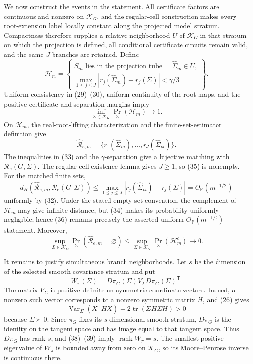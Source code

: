 We now construct the events in the statement.  All certificate factors are continuous and nonzero on \(\mathcal K_G\), and the regular-cell construction makes every root-extension label locally constant along the projected model stratum.  Compactness therefore supplies a relative neighborhood \(U\) of \(\mathcal K_G\) in that stratum on which the projection is defined, all conditional certificate circuits remain valid, and the same \(J\) branches are retained.  Define
\[
 \mathcal H_m
 =\left\{
 \begin{array}{l}
 S_m\text{ lies in the projection tube},\quad
 \widehat\Sigma_m\in U,\\[2pt]
 \displaystyle
 \max_{1\leq j\leq J}
 |r_j(\widehat\Sigma_m)-r_j(\Sigma)|<\gamma/3
 \end{array}
 \right\}.                                                      \tag{33}
\]
Uniform consistency in (29)--(30), uniform continuity of the root maps, and the positive certificate and separation margins imply
\[
 \inf_{\Sigma\in\mathcal K_G}
 \Pr_\Sigma(\mathcal H_m)\longrightarrow1.                     \tag{34}
\]
On \(\mathcal H_m\), the real-root-lifting characterization and the finite-set-estimator definition give
\[
 \widehat{\mathcal R}_{e,m}
 =\{r_1(\widehat\Sigma_m),\ldots,r_J(\widehat\Sigma_m)\}.      \tag{35}
\]
The inequalities in (33) and the \(\gamma\)-separation give a bijective matching with \(\mathcal R_e(G,\Sigma)\).  The regular-cell-existence lemma gives \(J\geq1\), so (35) is nonempty.  For the matched finite sets,
\[
 d_H\!\left(\widehat{\mathcal R}_{e,m},
              \mathcal R_e(G,\Sigma)\right)
 \leq\max_{1\leq j\leq J}
       |r_j(\widehat\Sigma_m)-r_j(\Sigma)|
 =O_{\mathbb P}(m^{-1/2})                                      \tag{36}
\]
uniformly by (32).  Under the stated empty-set convention, the complement of \(\mathcal H_m\) may give infinite distance, but (34) makes its probability uniformly negligible; hence (36) remains precisely the asserted uniform \(O_{\mathbb P}(m^{-1/2})\) statement.  Moreover,
\[
 \sup_{\Sigma\in\mathcal K_G}
 \Pr_\Sigma(\widehat{\mathcal R}_{e,m}=\varnothing)
 \leq
 \sup_{\Sigma\in\mathcal K_G}\Pr_\Sigma(\mathcal H_m^c)
 \longrightarrow0.                                             \tag{37}
\]

It remains to justify simultaneous branch neighborhoods.  Let \(s\) be the dimension of the selected smooth covariance stratum and put
\[
 W_\pi(\Sigma)
 =D\pi_G(\Sigma)V_\Sigma D\pi_G(\Sigma)^{\mathsf T}.           \tag{38}
\]
The matrix \(V_\Sigma\) is positive definite on symmetric-coordinate vectors.  Indeed, a nonzero such vector corresponds to a nonzero symmetric matrix \(H\), and (26) gives
\[
 \operatorname{Var}_\Sigma(X^{\mathsf T}HX)
 =2\operatorname{tr}(\Sigma H\Sigma H)>0                       \tag{39}
\]
because \(\Sigma\succ0\).  Since \(\pi_G\) fixes its \(s\)-dimensional smooth stratum, \(D\pi_G\) is the identity on the tangent space and has image equal to that tangent space.  Thus \(D\pi_G\) has rank \(s\), and (38)--(39) imply \(\operatorname{rank}W_\pi=s\).  The smallest positive eigenvalue of \(W_\pi\) is bounded away from zero on \(\mathcal K_G\), so its Moore--Penrose inverse is continuous there.

